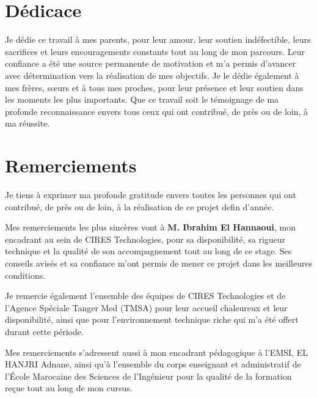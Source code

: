 \documentclass[11pt,a4paper]{report}
\begin{document}
\chapter*{Dédicace}

\normalsize
\setlength{\parskip}{0.8em}

Je dédie ce travail à mes parents, pour leur amour, leur soutien indéfectible,
leurs sacrifices et leurs encouragements constants tout au long de mon
parcours. Leur confiance a été une source permanente de motivation et m'a
permis d'avancer avec détermination vers la réalisation de mes objectifs. Je
le dédie également à mes frères, sœurs et à tous mes proches, pour leur
présence et leur soutien dans les moments les plus importants. Que ce travail
soit le témoignage de ma profonde reconnaissance envers tous ceux qui ont
contribué, de près ou de loin, à ma réussite.

\newpage
\chapter*{Remerciements}
\vspace{-1em}

\normalsize
\setlength{\parskip}{0.8em}

Je tiens à exprimer ma profonde gratitude envers toutes les personnes qui ont
contribué, de près ou de loin, à la réalisation de ce projet defin d'année.

Mes remerciements les plus sincères vont à \textbf{M. Ibrahim El Hannaoui},
mon encadrant au sein de CIRES Technologies, pour sa disponibilité, sa rigueur
technique et la qualité de son accompagnement tout au long de ce stage. Ses
conseils avisés et sa confiance m'ont permis de mener ce projet dans les
meilleures conditions.

Je remercie également l'ensemble des équipes de CIRES Technologies et de
l'Agence Spéciale Tanger Med (TMSA) pour leur accueil chaleureux et leur
disponibilité, ainsi que pour l'environnement technique riche qui m'a été
offert durant cette période.

Mes remerciements s'adressent aussi à mon encadrant pédagogique à l'EMSI,
{ EL HANJRI Adnane}, ainsi qu'à l'ensemble du corps enseignant et administratif de
l'École Marocaine des Sciences de l'Ingénieur pour la qualité de la formation
reçue tout au long de mon cursus.
\end{document}
